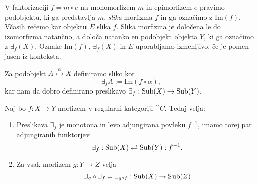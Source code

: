 \documentclass[../kategoricna_logika.tex]{subfiles}
\begin{document}
\begin{definicija}
  V faktorizaciji $f = m \circ e$ na monomorfizem $m$ in epimorfizem $e$
  pravimo podobjektu, ki ga predstavlja $m$, \emph{slika} morfizma $f$
  in ga označimo z $\mathrm{Im}(f)$.
  Včasih rečemo kar objektu $E$ slika $f$.
  Slika morfizma je določena le do izomorfizma natančno, a določa
  natanko en podobjekt objekta $Y$, ki ga označimo z $\exists_f(X)$.
  Oznake $\mathrm{Im}(f)$, $\exists_f(X)$ in $E$ uporabljamo
  izmenljivo, če je pomen jasen iz konteksta.

  Za podobjekt $A \overset{\alpha}{\rightarrowtail} X$ definiramo
  sliko kot
$$\exists_f A := \mathrm{Im}(f \circ \alpha),$$
kar nam da dobro definirano preslikavo
$\exists_f : \operatorname{Sub}(X) \to \operatorname{Sub}(Y)$.
\end{definicija}
\begin{comment}
  Če se malo poigramo s temi slikami, dobimo diagram
  \begin{equation*}
    \begin{tikzcd}
      A \times_Y A \ar[d, shift left , "a_1"] \ar[d, shift right,
      "a_2"'] \ar[r, dashed, "u"] &
      X \times_Y X \ar[d, shift left, "p_1"] \ar[d, shift right, "p_2"'] & \\
      A \ar[d, two heads, "a"] \ar[r, tail, "\alpha"] & X \ar[dr, "f"]
      \ar[r, two heads, "q"] &
      \exists_f X \ar[d, tail, "m"] \\
      \exists_f A \ar[rr, tail] \ar[urr, dashed, "\dot{\imath}"] & & Y
    \end{tikzcd}
  \end{equation*}
  iz katerega lahko zaradi enoličnosti slik (do izomorfizma natančno)
  razberemo, da je $\dot{\imath}$ monomorfizem.
\end{comment}
\begin{lema}
  Naj bo $f : X \to Y$ morfizem v regularni kategoriji $\cat{C}$.
  Tedaj velja:
  \begin{enumerate}[label=(\roman*)]
  \item Preslikava $\exists_f$ je monotona in levo adjungirana povleku
    $f^{-1}$, imamo torej par adjungiranih funktorjev
    $$\exists_f : \operatorname{Sub}(X) \rightleftarrows \operatorname{Sub}(Y) : f^{-1}.$$
  \item Za vsak morfizem $g : Y \to Z$ velja
    $$\exists_g \circ \exists_f = \exists_{g \circ f} : \operatorname{Sub}(X) \to
    \operatorname{Sub}(Z)$$
  \end{enumerate}
\end{lema}
\end{document}
